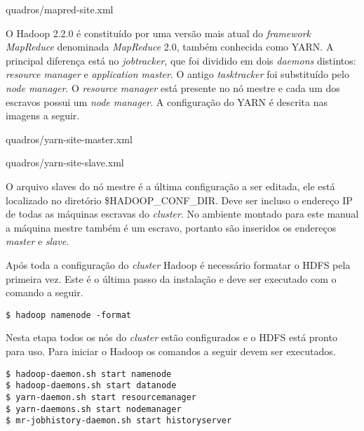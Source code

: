 \begin{apendicesenv}

		{quadros/mapred-site.xml}

O Hadoop 2.2.0 é constituído por uma versão mais atual do \textit{framework} \textit{MapReduce} denominada \textit{MapReduce} 2.0, também conhecida como YARN. A principal diferença está no \textit{jobtracker}, que foi dividido em dois \textit{daemons} distintos: \textit{resource manager} e \textit{application master}. O antigo \textit{tasktracker} foi substituído pelo \textit{node manager}. O \textit{resource manager} está presente no nó mestre e cada um dos escravos possui um \textit{node manager}. A configuração do YARN é descrita nas imagens a seguir.

\newpage

		{quadros/yarn-site-master.xml}

\newpage

		{quadros/yarn-site-slave.xml}


O arquivo slaves do nó mestre é a última configuração a ser editada, ele está localizado no diretório \$HADOOP\_CONF\_DIR. Deve ser incluso o endereço IP de todas as máquinas escravas do \textit{cluster}. No ambiente montado para este manual a máquina mestre também é um escravo, portanto são inseridos os endereços \textit{master} e \textit{slave}.

Após toda a configuração do \textit{cluster} Hadoop é necessário formatar o HDFS pela primeira vez. Este é o última passo da instalação e deve ser executado com o comando a seguir.

\begin{lstlisting}[style=abnt,frame=single]
$ hadoop namenode -format
\end{lstlisting}

Nesta etapa todos os nós do \textit{cluster} estão configurados e o HDFS está pronto para uso. Para iniciar o Hadoop os comandos a seguir devem ser executados.

\newpage
\begin{lstlisting}[style=abnt,frame=single]
$ hadoop-daemon.sh start namenode 
$ hadoop-daemons.sh start datanode 
$ yarn-daemon.sh start resourcemanager 
$ yarn-daemons.sh start nodemanager 
$ mr-jobhistory-daemon.sh start historyserver
\end{lstlisting}


\end{apendicesenv}
